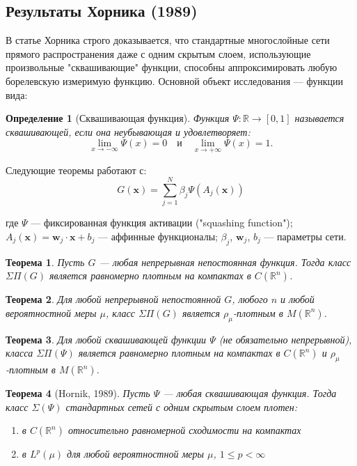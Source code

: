\documentclass[12pt]{article}
\newtheorem{theorem}{Теорема}
\newtheorem{definition}{Определение}
\begin{document}
	\subsection{Результаты Хорника (1989)}
	
	В статье Хорника строго доказывается, что стандартные многослойные сети прямого распространения даже с одним скрытым слоем, использующие произвольные "сквашивающие" функции, способны аппроксимировать любую борелевскую измеримую функцию. Основной объект исследования — функции вида:
	
	\begin{definition}[Сквашивающая функция]
		Функция $\Psi: \mathbb{R} \to [0,1]$ называется сквашивающей, если она неубывающая и удовлетворяет:
		\[
		\lim_{x \to -\infty} \Psi(x) = 0 \quad \text{и} \quad \lim_{x \to +\infty} \Psi(x) = 1.
		\]
	\end{definition}
	
	Следующие теоремы работают с:
	\begin{equation}
		G(\mathbf{x}) = \sum_{j=1}^{N} \beta_j \Psi(A_j(\mathbf{x}))
	\end{equation}
	
	где $\Psi$ — фиксированная функция активации ("squashing function"); 
	$A_j(\mathbf{x}) = \mathbf{w}_j \cdot \mathbf{x} + b_j$ — аффинные функционалы;
	$\beta_j$, $\mathbf{w}_j$, $b_j$ — параметры сети.
	\begin{theorem}
		Пусть $G$ — любая непрерывная непостоянная функция. Тогда класс $\Sigma\Pi(G)$ является равномерно плотным на компактах в $C(\mathbb{R}^n)$.
	\end{theorem}
	
	\begin{theorem}
		Для любой непрерывной непостоянной $G$, любого $n$ и любой вероятностной меры $\mu$, класс $\Sigma\Pi(G)$ является $\rho_\mu$-плотным в $M(\mathbb{R}^n)$.
	\end{theorem}
	
	\begin{theorem}
		Для любой сквашивающей функции $\Psi$ (не обязательно непрерывной), класса $\Sigma\Pi(\Psi)$ является равномерно плотным на компактах в $C(\mathbb{R}^n)$ и $\rho_\mu$-плотным в $M(\mathbb{R}^n)$.
	\end{theorem}
	
	\begin{theorem}[Hornik, 1989]
		Пусть $\Psi$ --- любая сквашивающая функция. Тогда класс $\Sigma(\Psi)$ стандартных сетей с одним скрытым слоем плотен:
		\begin{enumerate}
			\item в $C(\mathbb{R}^n)$ относительно равномерной сходимости на компактах
			\item в $L^p(\mu)$ для любой вероятностной меры $\mu$, $1 \leq p < \infty$
		\end{enumerate}
	\end{theorem}
	
\end{document}
